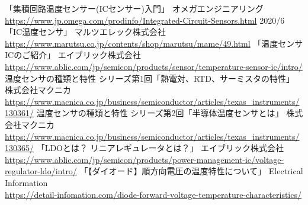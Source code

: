 \documentclass[twocolumn]{jsarticle}
\begin{document}
\begin{thebibliography}{99}
     「集積回路温度センサー(ICセンサー)入門」 オメガエンジニアリング \\
        \url{https://www.jp.omega.com/prodinfo/Integrated-Circuit-Sensors.html}
        2020/6
     「IC温度センサ」 マルツエレック株式会社 \\
        \url{https://www.marutsu.co.jp/contents/shop/marutsu/mame/49.html}
     「温度センサICのご紹介」 エイブリック株式会社 \\
        \url{https://www.ablic.com/jp/semicon/products/sensor/temperature-sensor-ic/intro/}
     温度センサの種類と特性 シリーズ第1回「熱電対、RTD、サーミスタの特性」
        株式会社マクニカ \\
        \url{https://www.macnica.co.jp/business/semiconductor/articles/texas_instruments/130361/}
     温度センサの種類と特性 シリーズ第2回「半導体温度センサとは」
        株式会社マクニカ \\
        \url{https://www.macnica.co.jp/business/semiconductor/articles/texas_instruments/130365/}
     「LDOとは？ リニアレギュレータとは？」 エイブリック株式会社 \\
        \url{https://www.ablic.com/jp/semicon/products/power-management-ic/voltage-regulator-ldo/intro/}
     「【ダイオード】順方向電圧の温度特性について」 Electrical Information \\
        \url{https://detail-infomation.com/diode-forward-voltage-temperature-characteristics/}
\end{thebibliography}
\end{document}

